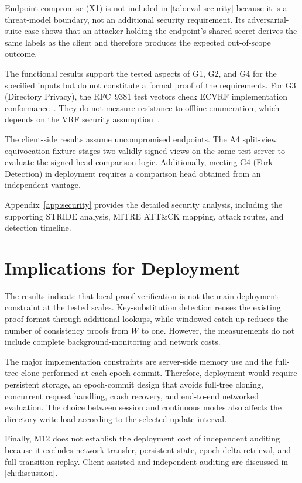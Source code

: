 Endpoint compromise (X1) is not included in \cref{tab:eval-security} because it is a threat-model
boundary, not an additional security requirement. Its adversarial-suite case shows that an attacker
holding the endpoint's shared secret derives the same labels as the client and therefore produces
the expected out-of-scope outcome.

The functional results support the tested aspects of G1, G2, and G4 for the specified inputs but do
not constitute a formal proof of the requirements. For G3 (Directory Privacy), the RFC~9381 test
vectors check ECVRF implementation conformance~\cite[Appendix~B.3]{rfc9381}. They do not measure
resistance to offline enumeration, which depends on the VRF security
assumption~\cite{rfc9381}.

The client-side results assume uncompromised endpoints. The A4 split-view equivocation fixture
stages two validly signed views on the same test server to evaluate the signed-head comparison
logic. Additionally, meeting G4 (Fork Detection) in deployment requires a comparison head obtained
from an independent vantage.

Appendix~\ref{app:security} provides the detailed security analysis, including the supporting
STRIDE analysis, MITRE ATT\&CK mapping, attack routes, and detection timeline.

\section{Implications for Deployment}\label{sec:eval-deploy}

The results indicate that local proof verification is not the main deployment constraint at the
tested scales. Key-substitution detection reuses the existing proof format through additional
lookups, while windowed catch-up reduces the number of consistency proofs from $W$ to one. However,
the measurements do not include complete background-monitoring and network costs.

The major implementation constraints are server-side memory use and the full-tree clone performed
at each epoch commit. Therefore, deployment would require persistent storage, an epoch-commit design
that avoids full-tree cloning, concurrent request handling, crash recovery, and end-to-end networked
evaluation. The choice between session and continuous modes
also affects the directory write load according to the selected update interval.

Finally, M12 does not establish the deployment cost of independent auditing because it excludes
network transfer, persistent state, epoch-delta retrieval, and full transition replay.
Client-assisted and independent auditing are discussed in \cref{ch:discussion}.
